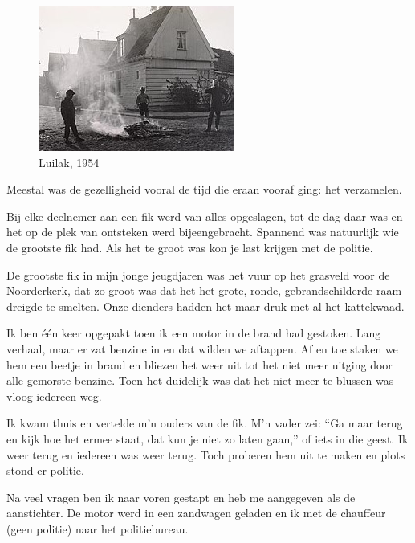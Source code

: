 \documentclass[12pt,twoside]{memoir}
\begin{document}
\begin{figure}
\includegraphics[width=\textwidth]{img/ch9/luilak1954}
\caption*{\footnotesize Luilak, 1954}
\end{figure}

Meestal was de gezelligheid vooral de tijd die eraan vooraf ging: het verzamelen. 

Bij elke deelnemer aan een fik werd van alles opgeslagen, tot de dag daar was en het op de plek van ontsteken werd bijeengebracht. Spannend was natuurlijk wie de grootste fik had. Als het te groot was kon je last krijgen met de politie.

De grootste fik in mijn jonge jeugdjaren was het vuur op het grasveld voor de Noorderkerk, dat zo groot was dat het het grote, ronde, gebrandschilderde raam dreigde te smelten. Onze dienders hadden het maar druk met al het kattekwaad. 

Ik ben één keer opgepakt toen ik een motor in de brand had gestoken. Lang verhaal, maar er zat benzine in en dat wilden we aftappen. Af en toe staken we hem een beetje in brand en bliezen het weer uit tot het niet meer uitging door alle gemorste benzine. Toen het duidelijk was dat het niet meer te blussen was vloog iedereen weg. 

Ik kwam thuis en vertelde m’n ouders van de fik. M’n vader zei: ``Ga maar terug en kijk hoe het ermee staat, dat kun je niet zo laten gaan,'' of iets in die geest. Ik weer terug en iedereen was weer terug. Toch proberen hem uit te maken en plots stond er politie. 

Na veel vragen ben ik naar voren gestapt en heb me aangegeven als de aanstichter. De motor werd in een zandwagen geladen en ik met de chauffeur (geen politie) naar het politiebureau. 
\end{document}
